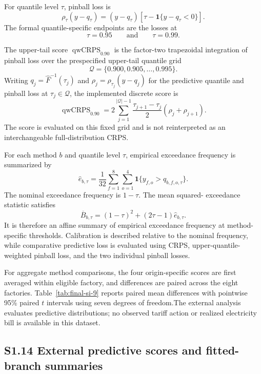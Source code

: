 \documentclass[AMA,Times1COL]{WileyNJDv5}
\begin{document}
For quantile level \(\tau\), pinball loss is
\[
\rho_\tau(y-q_\tau)
=
(y-q_\tau)
\left[
\tau-\mathbf 1\{y-q_\tau<0\}
\right].
\]
The formal quantile-specific endpoints are the losses at
\[
\tau=0.95
\qquad\text{and}\qquad
\tau=0.99.
\]

The upper-tail score
\(\operatorname{qwCRPS}_{0.90}\) is the factor-two trapezoidal
integration of pinball loss over the prespecified upper-tail quantile
grid
\[
\mathcal Q
=
\{0.900,0.905,\ldots,0.995\}.
\]
Writing $q_j=\widehat F^{-1}(\tau_j)$ and
$\rho_j=\rho_{\tau_j}(y-q_j)$ for the predictive quantile and
pinball loss at $\tau_j\in\mathcal Q$, the implemented discrete score
is
\[
\operatorname{qwCRPS}_{0.90}
=
2\sum_{j=1}^{|\mathcal Q|-1}
\frac{\tau_{j+1}-\tau_j}{2}
\left(\rho_j+\rho_{j+1}\right).
\]
The score is evaluated on this fixed grid and is not reinterpreted as an
interchangeable full-distribution CRPS.

For each method $b$ and quantile level $\tau$, empirical exceedance
frequency is summarized by
\[
\widehat e_{b,\tau}
=\frac{1}{32}\sum_{f=1}^{8}\sum_{o=1}^{4}
\mathbf 1\{y_{f,o}>q_{b,f,o,\tau}\}.
\]
The nominal exceedance frequency is $1-\tau$. The mean squared-
exceedance statistic satisfies
\[
\overline B_{b,\tau}
=(1-\tau)^2+(2\tau-1)\widehat e_{b,\tau}.
\]
It is therefore an affine summary of empirical exceedance frequency at
method-specific thresholds. Calibration is described relative to the
nominal frequency, while comparative predictive loss is evaluated
using CRPS, upper-quantile-weighted pinball loss, and the two
individual pinball losses.

For aggregate method comparisons, the four origin-specific scores are
first averaged within eligible factory, and differences are paired
across the eight factories. Table~\ref{tab:final-si-9} reports paired
mean differences with pointwise 95\% paired $t$ intervals using seven
degrees of freedom.The external analysis evaluates
predictive distributions; no observed tariff action or realized
electricity bill is available in this dataset.






\subsection*{S1.14 External predictive scores and fitted-branch summaries}
\end{document}
